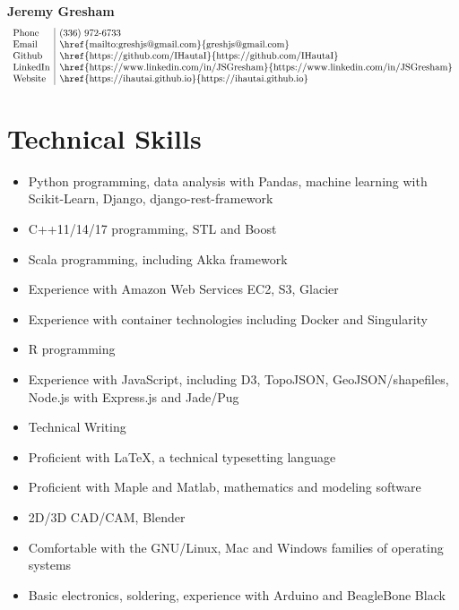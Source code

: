 \documentclass[11pt]{article}
\begin{document}
\begin{center}
{\bf\Large Jeremy Gresham}\\
\vspace{1em}
\[
\begin{array}{l|l}
\setlength{\arraycolsep}{1pt}
\mbox{Phone} & $(336) 972-6733$ \\
\mbox{Email} & $\href{mailto:greshjs@gmail.com}{greshjs@gmail.com}$ \\
\mbox{Github} & $\href{https://github.com/IHautaI}{https://github.com/IHautaI}$ \\
\mbox{LinkedIn} & $\href{https://www.linkedin.com/in/JSGresham}{https://www.linkedin.com/in/JSGresham}$ \\
\mbox{Website} & $\href{https://ihautai.github.io}{https://ihautai.github.io}$ \\
\end{array}
\]

\end{center}


\section*{Technical Skills}

\begin{itemize}
\setlength{\itemsep}{.5pt}
\item Python programming, data analysis with Pandas, machine learning with Scikit-Learn, Django, django-rest-framework
\item C++11/14/17 programming, STL and Boost
\item Scala programming, including Akka framework
\item Experience with Amazon Web Services EC2, S3, Glacier
\item Experience with container technologies including Docker and Singularity
\item R programming
\item Experience with JavaScript, including D3, TopoJSON, GeoJSON/shapefiles,
 Node.js with Express.js and Jade/Pug
\item Technical Writing
\item	Proficient with {\rmfamily \LaTeX}, a technical typesetting language
\item Proficient with Maple and Matlab, mathematics and modeling software
\item	2D/3D CAD/CAM, Blender
\item Comfortable with the GNU/Linux, Mac and Windows families of operating systems
\item	Basic electronics, soldering, experience with Arduino and BeagleBone Black
\end{itemize}
\end{document}
